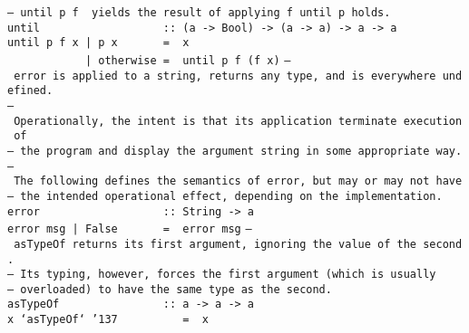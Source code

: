 \mbox{\tt --\ until\ p\ f\ \ yields\ the\ result\ of\ applying\ f\ until\ p\ holds.}\\
\mbox{\tt until\ \ \ \ \ \ \ \ \ \ \ \ \ \ \ \ \ \ \ ::\ (a\ ->\ Bool)\ ->\ (a\ ->\ a)\ ->\ a\ ->\ a}\\
\mbox{\tt until\ p\ f\ x\ |\ p\ x\ \ \ \ \ \ \ =\ \ x}\\
\mbox{\tt \ \ \ \ \ \ \ \ \ \ \ \ |\ otherwise\ =\ \ until\ p\ f\ (f\ x)}
%
\eprogB\noindent\bprogB
\mbox{\tt --\ error\ is\ applied\ to\ a\ string,\ returns\ any\ type,\ and\ is\ everywhere\ undefined.}\\
\mbox{\tt --\ Operationally,\ the\ intent\ is\ that\ its\ application\ terminate\ execution\ of}\\
\mbox{\tt --\ the\ program\ and\ display\ the\ argument\ string\ in\ some\ appropriate\ way.}\\
\mbox{\tt --\ The\ following\ defines\ the\ semantics\ of\ error,\ but\ may\ or\ may\ not\ have}\\
\mbox{\tt --\ the\ intended\ operational\ effect,\ depending\ on\ the\ implementation.}\\
\mbox{\tt error\ \ \ \ \ \ \ \ \ \ \ \ \ \ \ \ \ \ \ ::\ String\ ->\ a}\\
\mbox{\tt error\ msg\ |\ False\ \ \ \ \ \ \ =\ \ error\ msg}
%
\eprogB\noindent\bprogB
\mbox{\tt --\ asTypeOf\ returns\ its\ first\ argument,\ ignoring\ the\ value\ of\ the\ second.}\\
\mbox{\tt --\ Its\ typing,\ however,\ forces\ the\ first\ argument\ (which\ is\ usually}\\
\mbox{\tt --\ overloaded)\ to\ have\ the\ same\ type\ as\ the\ second.}\\
\mbox{\tt asTypeOf\ \ \ \ \ \ \ \ \ \ \ \ \ \ \ \ ::\ a\ ->\ a\ ->\ a}\\
\mbox{\tt x\ `asTypeOf`\ {\char'137}\ \ \ \ \ \ \ \ \ \ =\ \ x}
%
\eprogB
